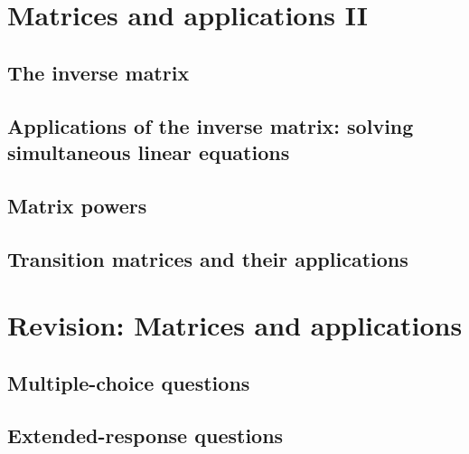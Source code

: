 \documentclass[a4paper,11pt]{article}
\begin{document}
\section{Matrices and applications II}
\begin{outline}

\0
\subsection{The inverse matrix}

\0
\subsection{Applications of the inverse matrix: solving simultaneous linear equations}

\0
\subsection{Matrix powers}

\0
\subsection{Transition matrices and their applications}

\end{outline}

\newpage

\section{Revision: Matrices and applications}
\begin{outline}

\0
\subsection{Multiple-choice questions}

\0
\subsection{Extended-response questions}

\end{outline}
\end{document}
